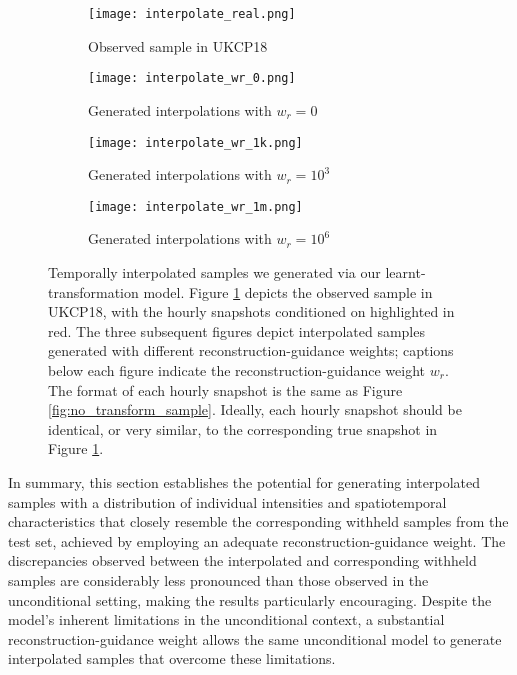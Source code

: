 \documentclass[ oneside,%
                    author={George Herbert},
                    degree={MSci},
                     title={Diffusion Models for Time-Evolving Precipitation Fields},
                  subtitle={}]{dissertation}
\begin{document}
\begin{figure}[htbp]
      \centering
      \begin{subfigure}{\textwidth}
            \texttt{[image: interpolate\_real.png]}
            \caption{Observed sample in UKCP18}
            \label{fig:interpolate_sample_real}
      \end{subfigure}
      \begin{subfigure}{\textwidth}
            \texttt{[image: interpolate\_wr\_0.png]}
            \caption{Generated interpolations with $w_r=0$}
            \label{fig:interpolate_sample_wr_0}
      \end{subfigure}
      \begin{subfigure}{\textwidth}
            \texttt{[image: interpolate\_wr\_1k.png]}
            \caption{Generated interpolations with $w_r=10^3$}
            \label{fig:interpolate_sample_wr_1k}
      \end{subfigure}
      \begin{subfigure}{\textwidth}
            \texttt{[image: interpolate\_wr\_1m.png]}
            \caption{Generated interpolations with $w_r=10^6$}
            \label{fig:interpolate_sample_wr_1m}
      \end{subfigure}
      \caption{Temporally interpolated samples we generated via our learnt-transformation model. Figure \ref{fig:interpolate_sample_real} depicts the observed sample in UKCP18, with the hourly snapshots conditioned on highlighted in red. The three subsequent figures depict interpolated samples generated with different reconstruction-guidance weights; captions below each figure indicate the reconstruction-guidance weight $w_r$. The format of each hourly snapshot is the same as Figure \ref{fig:no_transform_sample}. Ideally, each hourly snapshot should be identical, or very similar, to the corresponding true snapshot in Figure \ref{fig:interpolate_sample_real}.}
      \label{fig:interpolate_sample}
\end{figure}

In summary, this section establishes the potential for generating interpolated samples with a distribution of individual intensities and spatiotemporal characteristics that closely resemble the corresponding withheld samples from the test set, achieved by employing an adequate reconstruction-guidance weight. The discrepancies observed between the interpolated and corresponding withheld samples are considerably less pronounced than those observed in the unconditional setting, making the results particularly encouraging. Despite the model's inherent limitations in the unconditional context, a substantial reconstruction-guidance weight allows the same unconditional model to generate interpolated samples that overcome these limitations.
\end{document}

